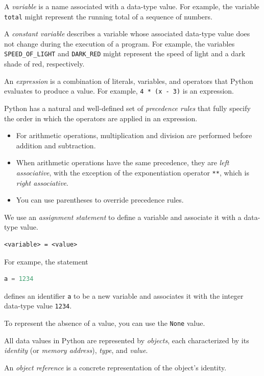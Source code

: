 \documentclass[8pt,a4paper,compress,handout]{beamer}
\begin{document}
\begin{frame}[fragile]
A \emph{variable} is a name associated with a data-type value. For example, the variable \lstinline{total} might represent the running total of a sequence of numbers.

\bigskip

A \emph{constant variable} describes a variable whose associated data-type value does not change during the execution of a program. For example, the variables \lstinline{SPEED_OF_LIGHT} and \lstinline{DARK_RED} might represent the speed of light and a dark shade of red, respectively.

\bigskip

An \emph{expression} is a combination of literals, variables, and operators that Python evaluates to produce a value. For example, \lstinline{4 * (x - 3)} is an expression.

\bigskip

Python has a natural and well-defined set of \emph{precedence rules} that fully specify the order in which the operators are applied in an expression. 
\begin{itemize}
\item For arithmetic operations, multiplication and division are performed before addition and subtraction. 

\item When arithmetic operations have the same precedence, they are \emph{left associative}, with the exception of the exponentiation operator \lstinline{**}, which is \emph{right associative}.

\item You can use parentheses to override precedence rules. 
\end{itemize} 
\end{frame}

\begin{frame}[fragile]
We use an \emph{assignment statement} to define a variable and associate it with a data-type value.
\begin{lstlisting}[language={}]
<variable> = <value>
\end{lstlisting}
For exampe, the statement 
\begin{lstlisting}[language=Python]
a = 1234
\end{lstlisting}
defines an identifier \lstinline{a} to be a new variable and associates it with the integer data-type value \lstinline{1234}.

\bigskip

To represent the absence of a value, you can use the \lstinline{None} value.

\bigskip

All data values in Python are represented by \emph{objects}, each characterized by its \emph{identity} (or \emph{memory address}), \emph{type}, and \emph{value}.

\bigskip

An \emph{object reference} is a concrete representation of the object's identity.
\end{frame}
\end{document}
